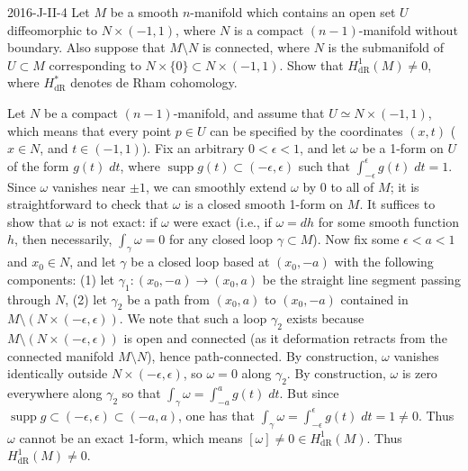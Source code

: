 \documentclass{article}
\begin{document}
	\begin{prb}{2016-J-II-4}
		Let $M$ be a smooth $n$-manifold which contains an open set $U$ diffeomorphic to $N \times (-1,1)$, where $N$ is a compact $(n - 1)$-manifold without boundary. Also suppose that $M \setminus N$ is connected, where $N$ is the submanifold of $U \subset M$ corresponding to $N \times \{0\} \subset N \times (-1,1)$. Show that $H^{1}_{\text{dR}}(M) \neq 0$, where $H^{\ast}_{\text{dR}}$ denotes de Rham cohomology. 
	\end{prb} 
	Let $N$ be a compact $(n -1)$-manifold, and assume that $U \simeq N \times (-1,1)$, which means that every point $p \in U$ can be specified by the coordinates $(x, t)$ ($x \in N$, and $t \in (-1,1)$). Fix an arbitrary $0 < \epsilon < 1$, and let $\omega$ be a 1-form on $U$ of the form $g(t)\;dt$, where $\operatorname{supp}{g(t)} \subset (-\epsilon, \epsilon)$ such that $\int_{-\epsilon}^{\epsilon}g(t)\;dt = 1$. Since $\omega$ vanishes near $\pm 1$, we can smoothly extend $\omega$ by 0 to all of $M$; it is straightforward to check that $\omega$ is a closed smooth 1-form on $M$. It suffices to show that $\omega$ is not exact: if $\omega$ were exact (i.e., if $\omega = dh$ for some smooth function $h$, then necessarily, $\int_{\gamma}\omega = 0$ for any closed loop $\gamma \subset M$). Now fix some $\epsilon < a < 1$ and $x_{0} \in N$, and let $\gamma$ be a closed loop based at $(x_{0}, -a)$ with the following components: (1) let $\gamma_{1}: (x_{0}, -a) \to (x_{0}, a)$ be the straight line segment passing through $N$, (2) let $\gamma_2$ be a path from $(x_0, a)$ to $(x_0, -a)$ contained in $M \setminus (N \times (-\epsilon, \epsilon))$. We note that such a loop $\gamma_2$ exists because $M \setminus (N \times (-\epsilon, \epsilon))$ is open and connected (as it deformation retracts from the connected manifold $M \setminus N$), hence path-connected. By construction, $\omega$ vanishes identically outside $N \times (-\epsilon, \epsilon)$, so $\omega = 0$ along $\gamma_2$. By construction, $\omega$ is zero everywhere along $\gamma_{2}$ so that $\int_{\gamma}\omega = \int_{-a}^{a}g(t)\;dt$. But since $\operatorname{supp}{g} \subset (-\epsilon, \epsilon) \subset (-a,a)$, one has that $\int_{\gamma}\omega = \int_{-\epsilon}^{\epsilon}g(t)\;dt = 1 \neq 0$. Thus $\omega$ cannot be an exact 1-form, which means $[\omega] \neq 0\in H^{1}_{\text{dR}}(M)$. Thus $H^{1}_{\text{dR}}(M) \neq 0$. 
	
\end{document}
